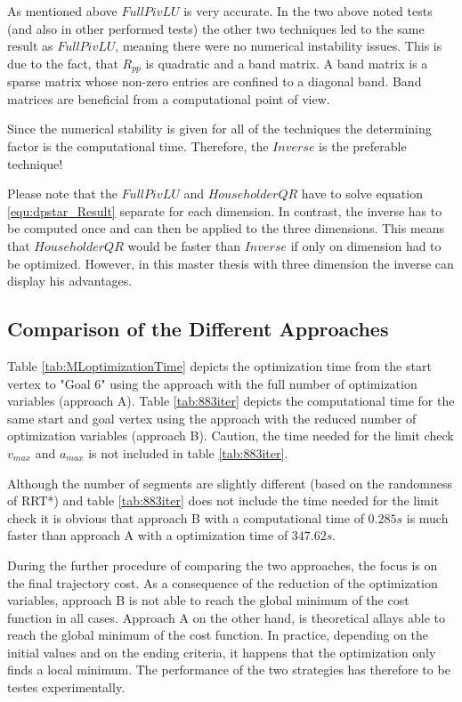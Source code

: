 As mentioned above $FullPivLU$ is very accurate. In the two above noted tests (and also in other performed tests) the other two techniques led to the same result as $FullPivLU$, meaning there were no numerical instability issues. This is due to the fact, that $R_{pp}$ is quadratic and a band matrix. A band matrix is a sparse matrix whose non-zero entries are confined to a diagonal band. Band matrices are beneficial from a computational point of view. \newline

Since the numerical stability is given for all of the techniques the determining factor is the computational time. Therefore, the $Inverse$ is the preferable technique! \newline

Please note that the $FullPivLU$ and $HouseholderQR$ have to solve equation \ref{equ:dpstar_Result} separate for each dimension. In contrast, the inverse has to be computed once and can then be applied to the three dimensions. This means that $HouseholderQR$ would be faster than $Inverse$ if only on dimension had to be optimized. However, in this master thesis with three dimension the inverse can display his advantages.


\subsection{Comparison of the Different Approaches}

Table \ref{tab:MLoptimizationTime} depicts the optimization time from the start vertex to "Goal 6" using the approach with the full number of optimization variables (approach A). Table \ref{tab:883iter} depicts the computational time for the same start and goal vertex using the approach with the reduced number of optimization variables (approach B). Caution, the time needed for the limit check $v_{max}$ and $a_{max}$ is not included in table \ref{tab:883iter}. \newline 

Although the number of segments are slightly different (based on the randomness of RRT*) and table \ref{tab:883iter} does not include the time needed for the limit check it is obvious that approach B with a computational time of $0.285s$ is much faster than approach A with a optimization time of $347.62s$.\newline 


During the further procedure of comparing the two approaches, the focus is on the final trajectory cost.
As a consequence of the reduction of the optimization variables, approach B is not able to reach the global minimum of the cost function in all cases. Approach A on the other hand, is theoretical allays able to reach the global minimum of the cost function. In practice, depending on the initial values and on the ending criteria, it happens that the optimization only finds a local minimum. The performance of the two strategies has therefore to be testes experimentally. \newpage

